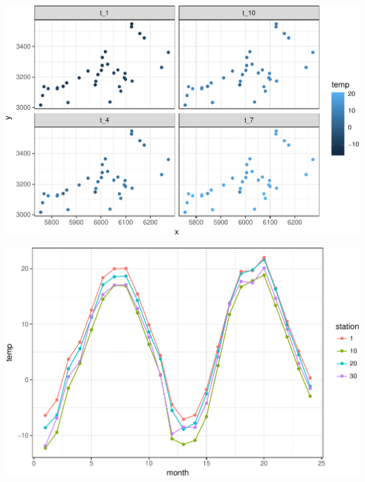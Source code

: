 \documentclass[11pt,ignorenonframetext,]{beamer}
\begin{document}
\begin{frame}{}
\protect\hypertarget{section}{}

\begin{center}\includegraphics[width=\textwidth]{Lec22_files/figure-beamer/unnamed-chunk-2-1} \end{center}

\end{frame}

\begin{frame}{}
\protect\hypertarget{section-1}{}

\begin{center}\includegraphics[width=\textwidth]{Lec22_files/figure-beamer/unnamed-chunk-3-1} \end{center}

\end{frame}
\end{document}
